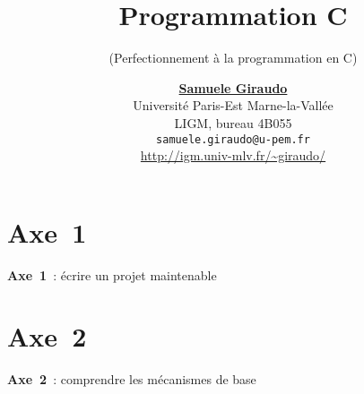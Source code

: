 \documentclass[10pt,xcolor={dvipsnames}]{beamer}
\title{{\bf Programmation {\sf C}}}
\author{\href{http://igm.univ-mlv.fr/~giraudo/}{\bf Samuele Giraudo} \\[1em]
{\small
Université Paris-Est Marne-la-Vallée \\[.2em]
LIGM, bureau 4B055 \\[.2em]
{\tt samuele.giraudo@u-pem.fr} \\[.2em]
\href{http://igm.univ-mlv.fr/~giraudo/}{http://igm.univ-mlv.fr/\~{}giraudo/}}}
\institute{}
\subtitle{(Perfectionnement à la programmation en {\sf C})}
\date{}
\begin{document}
\begin{frame}
    \titlepage
\end{frame}



\begin{frame} \frametitle{}
\part{Axe~1}
\begin{center} \Large
    {\bf Axe~1}~: écrire un projet maintenable
\end{center}

\begin{footnotesize}
    \tableofcontents[hideallsubsections,part=1]
\end{footnotesize}
\end{frame}






\begin{frame} \frametitle{}
\part{Axe~2}
\begin{center} \Large
    {\bf Axe~2}~: comprendre les mécanismes de base
\end{center}

\begin{footnotesize}
    \tableofcontents[hideallsubsections,part=2]
\end{footnotesize}
\end{frame}





\end{document}
